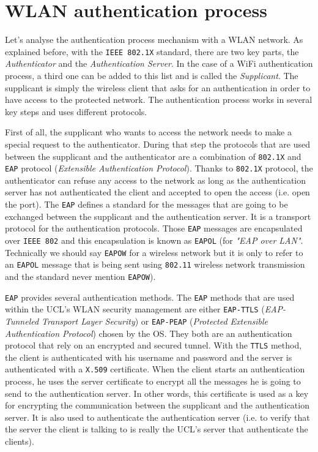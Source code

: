 \section{WLAN authentication process}
Let's analyse the authentication process mechanism with a WLAN network.
As explained before, with the \texttt{IEEE 802.1X} standard, there are two key parts, the \textit{Authenticator} and the \textit{Authentication Server}. In the case of a WiFi authentication process, a third one can be added to this list and is called the \textit{Supplicant}. The supplicant is simply the wireless client that asks for an authentication in order to have access to the protected network. The authentication process works in several key steps and uses different protocols.

First of all, the supplicant who wants to access the network needs to make a special request to the authenticator. During that step the protocols that are used between the supplicant and the authenticator are a combination of \texttt{802.1X} and \texttt{EAP} protocol (\textit{Extensible Authentication Protocol}). Thanks to \texttt{802.1X} protocol, the authenticator can refuse any access to the network as long as the authentication server has not authenticated the client and accepted to open the access (i.e. open the port). The \texttt{EAP} defines a standard for the messages that are going to be exchanged between the supplicant and the authentication server. It is a  transport protocol for the authentication protocols. Those \texttt{EAP} messages are encapsulated over \texttt{IEEE 802} and this encapsulation is known as \texttt{EAPOL} (for \textit{"EAP over LAN"}. Technically we should say \texttt{EAPOW} for a wireless network but it is only to refer to an \texttt{EAPOL} message that is being sent using \texttt{802.11} wireless network transmission and the standard never mention \texttt{EAPOW}).

\texttt{EAP} provides several authentication methods. The \texttt{EAP} methods that are used within the UCL's WLAN  security management are either \texttt{EAP-TTLS} (\textit{EAP-Tunneled Transport Layer Security}) or \texttt{EAP-PEAP} (\textit{Protected Extensible Authentication Protocol}) chosen by the OS. They both are an authentication protocol that rely on an encrypted and secured tunnel. With the \texttt{TTLS} method, the client is authenticated with his username and password and the server is authenticated with a \texttt{X.509} certificate. When the client starts an authentication process, he uses the server certificate to encrypt all the messages he is going to send to the authentication server. In other words, this certificate is used as a key for encrypting the communication between the supplicant and the authentication server. It is also used to authenticate the authentication server (i.e. to verify that the server the client is talking to is really the UCL's server that authenticate the clients).


